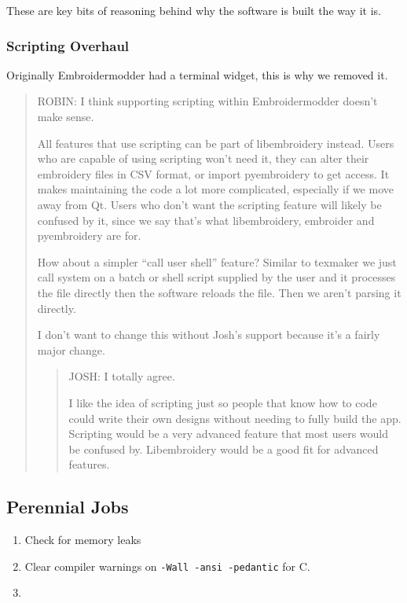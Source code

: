 \documentclass[a4paper, 11pt]{report}
\begin{document}
These are key bits of reasoning behind why the software is built the way
it is.

\hypertarget{scripting-overhaul}{%
\subsubsection{Scripting Overhaul}\label{scripting-overhaul}}

Originally Embroidermodder had a terminal widget, this is why we removed
it.

\begin{quote}
ROBIN: I think supporting scripting within Embroidermodder doesn't make
sense.

All features that use scripting can be part of libembroidery instead.
Users who are capable of using scripting won't need it, they can alter
their embroidery files in CSV format, or import pyembroidery to get
access. It makes maintaining the code a lot more complicated, especially
if we move away from Qt. Users who don't want the scripting feature will
likely be confused by it, since we say that's what libembroidery,
embroider and pyembroidery are for.

How about a simpler ``call user shell'' feature? Similar to texmaker we
just call system on a batch or shell script supplied by the user and it
processes the file directly then the software reloads the file. Then we
aren't parsing it directly.

I don't want to change this without Josh's support because it's a fairly
major change.

\begin{quote}
JOSH: I totally agree.

I like the idea of scripting just so people that know how to code could
write their own designs without needing to fully build the app.
Scripting would be a very advanced feature that most users would be
confused by. Libembroidery would be a good fit for advanced features.
\end{quote}
\end{quote}

\hypertarget{perennial-jobs}{%
\subsection{Perennial Jobs}\label{perennial-jobs}}

\begin{enumerate}
\def\labelenumi{\arabic{enumi}.}
\item
  Check for memory leaks
\item
  Clear compiler warnings on \texttt{-Wall\ -ansi\ -pedantic} for C.
\item
\end{enumerate}
\end{document}
